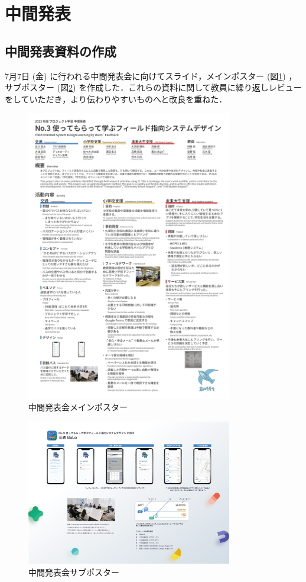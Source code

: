\section{中間発表}
\subsection{中間発表資料の作成}
7月7日 (金) に行われる中間発表会に向けてスライド，メインポスター (図\ref{fig:interim_poster}) ，サブポスター (図\ref{fig:interim_poster_bulo}) を作成した．これらの資料に関して教員に繰り返しレビューをしていただき，より伝わりやすいものへと改良を重ねた．

\begin{figure}[htbp]
    \centering
    \includegraphics[width=9cm]{images/interim_poster.png}
    \caption{中間発表会メインポスター}
    \label{fig:interim_poster}
\end{figure}

\begin{figure}[htbp]
    \centering
    \includegraphics[width=9cm]{images/interim_poster_bulo.png}
    \caption{中間発表会サブポスター}
    \label{fig:interim_poster_bulo}
\end{figure}

